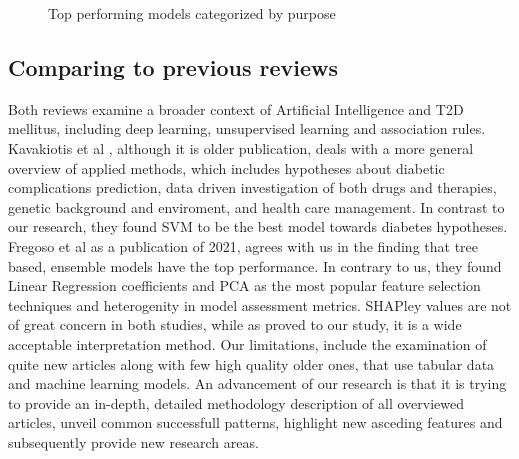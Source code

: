 \documentclass[journal,article,submit,pdftex,moreauthors]{Definitions/mdpi}
\begin{document}
\begin{figure}[!h]
	\centering
				    \caption{Top performing models categorized by purpose}
					\label{bar:top_models}
\end{figure}

\subsection{Comparing to previous reviews}

Both reviews \cite{Fregoso,KAVAKIOTIS2017104} examine a broader context of Artificial Intelligence and T2D mellitus, including 
deep learning, unsupervised learning and association rules. Kavakiotis et al \cite{KAVAKIOTIS2017104}, although it is older publication,
deals with a more general overview of applied methods, which includes hypotheses about diabetic complications prediction, data driven
investigation of both drugs and therapies, genetic background and enviroment, and health care management. In contrast to our research,
they found SVM to be the best model towards diabetes hypotheses. Fregoso et al \cite{Fregoso} as a publication of 2021, agrees with us
in the finding that tree based, ensemble models have the top performance. In contrary to us, they found Linear Regression coefficients
and PCA as the most popular feature selection techniques and heterogenity in model assessment metrics. SHAPley values are not of 
great concern in both studies, while as proved to our study, it is a wide acceptable interpretation method. Our limitations,
include the examination of quite new articles along  with few high quality older ones, that use tabular data and machine learning models.
An advancement of our research is that it is trying to provide an in-depth, detailed methodology description of all overviewed articles, 
unveil common successfull patterns, highlight new asceding features and subsequently provide new research areas.
\end{document}
